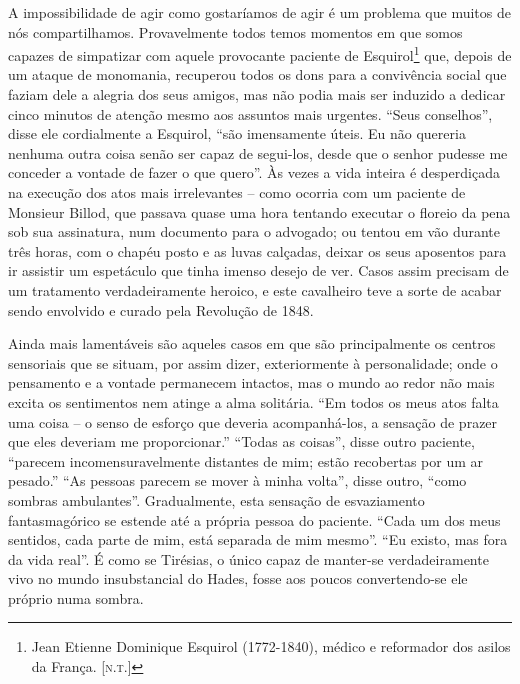 A impossibilidade de agir como gostaríamos de agir é um problema que
muitos de nós compartilhamos.  Provavelmente todos temos momentos em
que somos capazes de simpatizar com aquele provocante paciente de
Esquirol\footnote{ Jean Etienne Dominique Esquirol
(1772-1840), médico e reformador dos asilos da França. [\textsc{n.t.}]}
que, depois de um ataque de monomania, recuperou todos os dons para a
convivência social que faziam dele a alegria dos seus amigos, mas não
podia mais ser induzido a dedicar cinco minutos de atenção mesmo aos
assuntos mais urgentes.  “Seus conselhos”, disse ele cordialmente a
Esquirol, “são imensamente úteis. Eu não quereria nenhuma outra coisa
senão ser capaz de segui-los, desde que o senhor pudesse me conceder a
vontade de fazer o que quero”.  Às vezes a vida inteira é desperdiçada
na execução dos atos mais irrelevantes -- como ocorria com um paciente
de Monsieur Billod, que passava quase uma hora tentando executar o
floreio da pena sob sua assinatura, num documento para o advogado; ou
tentou em vão durante três horas, com o chapéu posto e as luvas
calçadas, deixar os seus aposentos para ir assistir um espetáculo que
tinha imenso desejo de ver.  Casos assim precisam de um tratamento
verdadeiramente heroico, e este cavalheiro teve a sorte de acabar sendo
envolvido e curado pela Revolução de 1848.  

Ainda mais lamentáveis são aqueles casos em que são principalmente os
centros sensoriais que se situam, por assim dizer, exteriormente à
personalidade; onde o pensamento e a vontade permanecem intactos, mas o
mundo ao redor não mais excita os sentimentos nem atinge a alma
solitária.  “Em todos os meus atos falta uma coisa -- o senso de esforço
que deveria acompanhá-los, a sensação de prazer que eles deveriam
me proporcionar.” “Todas as coisas”, disse outro paciente, “parecem
incomensuravelmente distantes de mim; estão recobertas por um ar
pesado.”  “As pessoas parecem se mover à minha volta”, disse outro,
“como sombras ambulantes”.  Gradualmente, esta sensação de esvaziamento
fantasmagórico se estende até a própria pessoa do paciente. “Cada um
dos meus sentidos, cada parte de mim, está separada de mim mesmo”. “Eu
existo, mas fora da vida real”. É como se Tirésias, o único capaz de
manter-se verdadeiramente vivo no mundo insubstancial do Hades, fosse
aos poucos convertendo-se ele próprio numa sombra. 

